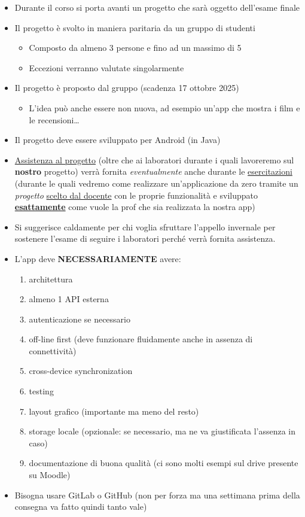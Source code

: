 \begin{itemize}
    \item Durante il corso si porta avanti un progetto che sarà oggetto dell'esame finale
    \item Il progetto è svolto in maniera paritaria da un gruppo di studenti
    \begin{itemize}
        \item Composto da almeno 3 persone e fino ad un massimo di 5
        \item Eccezioni verranno valutate singolarmente
    \end{itemize}
    \item Il progetto è proposto dal gruppo (scadenza 17 ottobre 2025)
    \begin{itemize}
        \item L'idea può anche essere non nuova, ad esempio un'app che mostra i film e le recensioni\dots
    \end{itemize}
    \item Il progetto deve essere sviluppato per Android (in Java)
    \item \underline{Assistenza al progetto} (oltre che ai laboratori durante i quali lavoreremo sul \textbf{nostro} progetto) verrà fornita \textit{eventualmente} anche durante le \underline{esercitazioni} (durante le quali vedremo come realizzare un'applicazione da zero tramite un \textit{progetto} \underline{scelto dal docente} con le proprie funzionalità e sviluppato \textbf{\underline{esattamente}} come vuole la prof che sia realizzata la nostra app)
    \item Si suggerisce caldamente per chi voglia sfruttare l'appello invernale per sostenere l'esame di seguire i laboratori perché verrà fornita assistenza.
    \item L'app deve \textbf{NECESSARIAMENTE} avere:
    \begin{enumerate}
        \item architettura
        \item almeno 1 API esterna
        \item autenticazione se necessario
        \item off-line first (deve funzionare fluidamente anche in assenza di connettività)
        \item cross-device synchronization
        \item testing
        \item layout grafico (importante ma meno del resto)
        \item storage locale (opzionale: se necessario, ma ne va giustificata l'assenza in caso)
        \item documentazione di buona qualità (ci sono molti esempi sul drive presente su Moodle)
    \end{enumerate}
    \item Bisogna usare GitLab o GitHub (non per forza ma una settimana prima della consegna va fatto quindi tanto vale)
\end{itemize}

